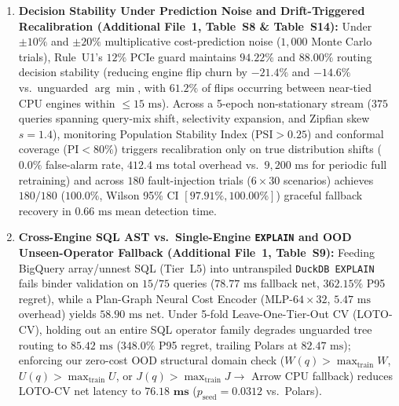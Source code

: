 \documentclass[10pt,a4paper]{article}
\begin{document}
\begin{enumerate}[leftmargin=1.5em,itemsep=0.8pt]
    \item \textbf{Decision Stability Under Prediction Noise and Drift-Triggered Recalibration (Additional File~1, Table~S8 \& Table~S14):} Under $\pm 10\%$ and $\pm 20\%$ multiplicative cost-prediction noise ($1{,}000$ Monte Carlo trials), Rule~U1's $12\%$ PCIe guard maintains $94.22\%$ and $88.00\%$ routing decision stability (reducing engine flip churn by $-21.4\%$ and $-14.6\%$ vs.\ unguarded $\arg\min$, with $61.2\%$ of flips occurring between near-tied CPU engines within $\le 15\text{ ms}$). Across a 5-epoch non-stationary stream ($375$ queries spanning query-mix shift, selectivity expansion, and Zipfian skew $s=1.4$), monitoring Population Stability Index ($\text{PSI}>0.25$) and conformal coverage ($\text{PI}<80\%$) triggers recalibration only on true distribution shifts ($0.0\%$ false-alarm rate, $412.4\text{ ms}$ total overhead vs.\ $9{,}200\text{ ms}$ for periodic full retraining) and across $180$ fault-injection trials ($6\times 30$ scenarios) achieves $180/180$ ($100.0\%$, Wilson 95\% CI $[97.91\%, 100.00\%]$) graceful fallback recovery in $0.66\text{ ms}$ mean detection time.
    \item \textbf{Cross-Engine SQL AST vs.\ Single-Engine \texttt{EXPLAIN} and OOD Unseen-Operator Fallback (Additional File~1, Table~S9):} Feeding BigQuery array/unnest SQL (Tier~L5) into untranspiled \texttt{DuckDB EXPLAIN} fails binder validation on $15/75$ queries ($78.77\text{ ms}$ fallback net, $362.15\%$ P95 regret), while a Plan-Graph Neural Cost Encoder (MLP-$64\times 32$, $5.47\text{ ms}$ overhead) yields $58.90\text{ ms}$ net. Under 5-fold Leave-One-Tier-Out CV (LOTO-CV), holding out an entire SQL operator family degrades unguarded tree routing to $85.42\text{ ms}$ ($348.0\%$ P95 regret, trailing Polars at $82.47\text{ ms}$); enforcing our zero-cost OOD structural domain check ($W(q)>\max_{\text{train}}W$, $U(q)>\max_{\text{train}}U$, or $J(q)>\max_{\text{train}}J \rightarrow$ Arrow CPU fallback) reduces LOTO-CV net latency to $\mathbf{76.18\text{ ms}}$ ($p_{\text{seed}}=0.0312$ vs.\ Polars).
\end{enumerate}

\end{document}
